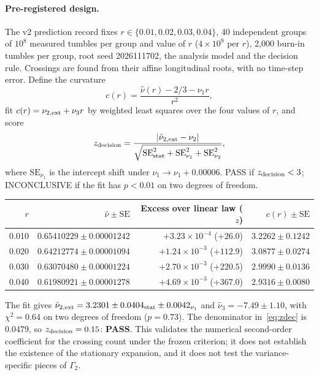 \documentclass[11pt]{article}
\theoremstyle{remark}\newtheorem{remark}[theorem]{Remark}
\begin{document}
\paragraph{Pre-registered design.} The v2 prediction record fixes $r\in\{0.01,0.02,0.03,0.04\}$, 40 independent groups of $10^8$ measured tumbles per group and value of $r$ ($4\times10^9$ per $r$), 2{,}000 burn-in tumbles per group, root seed 2026111702, the analysis model and the decision rule. Crossings are found from their affine longitudinal roots, with no time-step error. Define the curvature
\begin{equation}\label{eq:curv}
c(r)=\frac{\hat\nu(r)-2/3-\nu_1r}{r^2},
\end{equation}
fit $c(r)=\nu_{2,\rm ext}+\nu_3r$ by weighted least squares over the four values of $r$, and score
\begin{equation}\label{eq:zdec}
z_{\rm decision}=\frac{|\hat\nu_{2,\rm ext}-\nu_2|}{\sqrt{\mathrm{SE}_{\rm stat}^2+\mathrm{SE}_{\nu_1}^2+\mathrm{SE}_{\nu_2}^2}},
\end{equation}
where $\mathrm{SE}_{\nu_1}$ is the intercept shift under $\nu_1\to\nu_1+0.00006$. PASS if $z_{\rm decision}<3$; INCONCLUSIVE if the fit has $p<0.01$ on two degrees of freedom.

\begin{center}\small
\begin{tabular}{@{}rrrr@{}}\toprule
$r$ & $\hat\nu\pm\mathrm{SE}$ & Excess over linear law ($z$) & $c(r)\pm\mathrm{SE}$\\\midrule
0.010 & $0.65410229\pm0.00001242$ & $+3.23\times10^{-4}$ ($+26.0$) & $3.2262\pm0.1242$\\
0.020 & $0.64212774\pm0.00001094$ & $+1.24\times10^{-3}$ ($+112.9$) & $3.0877\pm0.0274$\\
0.030 & $0.63070480\pm0.00001224$ & $+2.70\times10^{-3}$ ($+220.5$) & $2.9990\pm0.0136$\\
0.040 & $0.61980921\pm0.00001278$ & $+4.69\times10^{-3}$ ($+367.0$) & $2.9316\pm0.0080$\\\bottomrule
\end{tabular}
\end{center}

The fit gives $\hat\nu_{2,\rm ext}=3.2301\pm0.0404_{\rm stat}\pm0.0042_{\nu_1}$ and $\hat\nu_3=-7.49\pm1.10$, with $\chi^2=0.64$ on two degrees of freedom ($p=0.73$). The denominator in~\eqref{eq:zdec} is $0.0479$, so $z_{\rm decision}=0.15$: \textbf{PASS}. This validates the numerical second-order coefficient for the crossing count under the frozen criterion; it does not establish the existence of the stationary expansion, and it does not test the variance-specific pieces of $\Gamma_2$.
\end{document}
